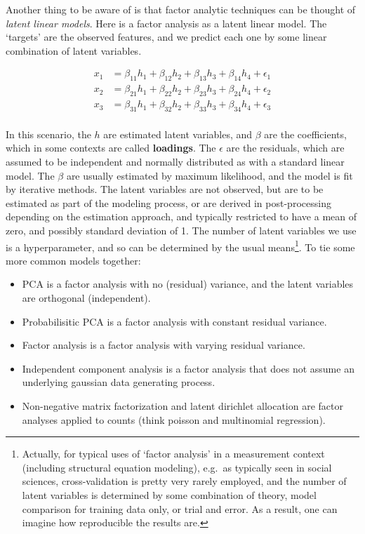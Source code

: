 \documentclass[
  letterpaper,
]{krantz}
\providecommand{\tightlist}{%
  \setlength{\itemsep}{0pt}\setlength{\parskip}{0pt}}\usepackage{longtable,booktabs,array}
\begin{document}
Another thing to be aware of is that factor analytic techniques can be
thought of \emph{latent linear models}. Here is a factor analysis as a
latent linear model. The `targets' are the observed features, and we
predict each one by some linear combination of latent variables.

\[
\begin{aligned}
x_1 &= \beta_{11} h_1 + \beta_{12} h_2 + \beta_{13} h_3 + \beta_{14} h_4 + \epsilon_1 \\
x_2 &= \beta_{21} h_1 + \beta_{22} h_2 + \beta_{23} h_3 + \beta_{24} h_4 + \epsilon_2 \\
x_3 &= \beta_{31} h_1 + \beta_{32} h_2 + \beta_{33} h_3 + \beta_{34} h_4 + \epsilon_3 \\
\end{aligned}
\]

In this scenario, the \(h\) are estimated latent variables, and
\(\beta\) are the coefficients, which in some contexts are called
\textbf{loadings}. The \(\epsilon\) are the residuals, which are assumed
to be independent and normally distributed as with a standard linear
model. The \(\beta\) are usually estimated by maximum likelihood, and
the model is fit by iterative methods. The latent variables are not
observed, but are to be estimated as part of the modeling process, or
are derived in post-processing depending on the estimation approach, and
typically restricted to have a mean of zero, and possibly standard
deviation of 1. The number of latent variables we use is a
hyperparameter, and so can be determined by the usual means\footnote{Actually,
  for typical uses of `factor analysis' in a measurement context
  (including structural equation modeling), e.g.~as typically seen in
  social sciences, cross-validation is pretty very rarely employed, and
  the number of latent variables is determined by some combination of
  theory, model comparison for training data only, or trial and error.
  As a result, one can imagine how reproducible the results are.}. To
tie some more common models together:

\begin{itemize}
\tightlist
\item
  PCA is a factor analysis with no (residual) variance, and the latent
  variables are orthogonal (independent).
\item
  Probabilisitic PCA is a factor analysis with constant residual
  variance.
\item
  Factor analysis is a factor analysis with varying residual variance.
\item
  Independent component analysis is a factor analysis that does not
  assume an underlying gaussian data generating process.
\item
  Non-negative matrix factorization and latent dirichlet allocation are
  factor analyses applied to counts (think poisson and multinomial
  regression).
\end{itemize}
\end{document}
